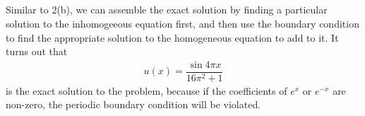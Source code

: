\documentclass[11pt]{article}
\begin{document}
\subsection{}
Similar to 2(b), we can assemble the exact solution by finding a particular solution to the inhomogeeous equation first, and then use the boundary condition to find the appropriate solution to the homogeneous equation to add to it. It turns out that \\
\begin{equation}\begin{split}
u(x) = \dfrac{\sin 4\pi x}{16\pi^2 + 1}
\end{split}\end{equation}
is the exact solution to the problem, because if the coefficients of $e^x$ or $e^{-x}$ are non-zero, the periodic boundary condition will be violated.
\end{document}
